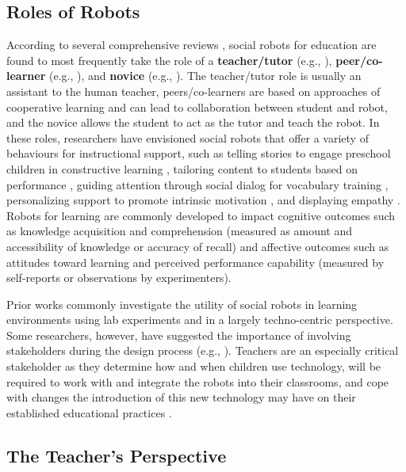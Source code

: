 \subsection{Roles of Robots}
\label{sec:3}
According to several comprehensive reviews \cite{belpaeme2018social,mubin13}, social robots for education are found to most frequently take the role of a \textbf{teacher/tutor} (e.g., \cite{Belpaeme2018Tutor, you06, Alemi2014, Hashimoto2013, Movellan2009, Kanda2004, Kanda2007, Hyun2008}), \textbf{peer/co-learner} (e.g., \cite{Kanda2004,zaga15,baxter17,Lubold2016}), and \textbf{novice} (e.g., \cite{Chase2009,tanaka07,Tanaka2012,Hood2015}). The teacher/tutor role is usually an assistant to the human teacher, peers/co-learners are based on approaches of cooperative learning and can lead to collaboration between student and robot, and the novice allows the student to act as the tutor and teach the robot. In these roles, researchers have envisioned social robots that offer a variety of behaviours for instructional support, such as
telling stories to engage preschool children in constructive learning \cite{fridin14}, tailoring content to students based on performance \cite{Leyzberg2014,Gordon2015}, guiding attention through social dialog for vocabulary training \cite{Saerbeck2010}, personalizing support to promote intrinsic motivation \cite{Janssen2011}, and displaying empathy \cite{Leite2014}. 
Robots for learning are commonly developed to impact cognitive outcomes such as knowledge acquisition and comprehension (measured as amount and accessibility of knowledge or accuracy of recall) and affective outcomes such as attitudes toward learning and perceived performance capability (measured by self-reports or observations by experimenters).

Prior works commonly investigate the utility of social robots in learning environments using lab experiments and in a largely techno-centric perspective. Some researchers, however, have suggested the importance of involving stakeholders during the design process (e.g., \cite{vsabanovic2010robots}). Teachers are an especially critical stakeholder as they determine how and when children use technology, will be required to work with and integrate the robots into their classrooms, and cope with changes the introduction of this new technology may have on their established educational practices \cite{nordkvelle2005visions}.



\subsection{The Teacher's Perspective}
\label{sec:4}


